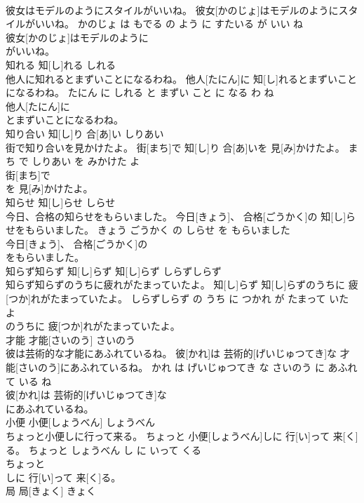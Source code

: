 \documentclass[8pt]{extreport}
\begin{document}
\begin{CJK}{UTF8}{min}
\\	彼女はモデルのようにスタイルがいいね。	彼女[かのじょ]はモデルのようにスタイルがいいね。	かのじょ は もでる の よう に すたいる が いい ね	
\\	彼女[かのじょ]はモデルのように
\\	がいいね。			
\\	知れる	知[し]れる	しれる	
\\	他人に知れるとまずいことになるわね。	他人[たにん]に 知[し]れるとまずいことになるわね。	たにん に しれる と まずい こと に なる わ ね	
\\	他人[たにん]に
\\	とまずいことになるわね。			
\\	知り合い	知[し]り 合[あ]い	しりあい	
\\	街で知り合いを見かけたよ。	街[まち]で 知[し]り 合[あ]いを 見[み]かけたよ。	まち で しりあい を みかけた よ	
\\	街[まち]で
\\	を 見[み]かけたよ。			
\\	知らせ	知[し]らせ	しらせ	
\\	今日、合格の知らせをもらいました。	今日[きょう]、 合格[ごうかく]の 知[し]らせをもらいました。	きょう ごうかく の しらせ を もらいました	
\\	今日[きょう]、 合格[ごうかく]の
\\	をもらいました。			
\\	知らず知らず	知[し]らず 知[し]らず	しらずしらず	
\\	知らず知らずのうちに疲れがたまっていたよ。	知[し]らず 知[し]らずのうちに 疲[つか]れがたまっていたよ。	しらずしらず の うち に つかれ が たまって いた よ	
\\	のうちに 疲[つか]れがたまっていたよ。			
\\	才能	才能[さいのう]	さいのう	
\\	彼は芸術的な才能にあふれているね。	彼[かれ]は 芸術的[げいじゅつてき]な 才能[さいのう]にあふれているね。	かれ は げいじゅつてき な さいのう に あふれて いる ね	
\\	彼[かれ]は 芸術的[げいじゅつてき]な
\\	にあふれているね。			
\\	小便	小便[しょうべん]	しょうべん	
\\	ちょっと小便しに行って来る。	ちょっと 小便[しょうべん]しに 行[い]って 来[く]る。	ちょっと しょうべん し に いって くる	
\\	ちょっと
\\	しに 行[い]って 来[く]る。			
\\	局	局[きょく]	きょく	

\end{CJK}
\end{document}
